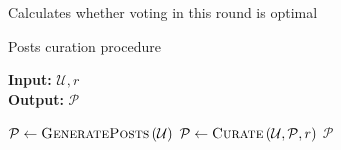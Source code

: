     \begin{algorithm}[H]
      \caption{Calculates whether voting in this round is optimal}
      \label{alg:isvoteround}
      \begin{algorithmic}[1]
          \State 
        \EndFunction
      \end{algorithmic}
    \end{algorithm}

    \begin{algorithm}[H]
      \caption{Posts curation procedure}
      \label{alg:main}
      \hspace*{\algorithmicindent} \textbf{Input:} $\mathcal{U}, r$ \\
      \hspace*{\algorithmicindent} \textbf{Output:} $\mathcal{P}$
      \begin{algorithmic}[1]
      \State $\mathcal{P} \leftarrow
      \textsc{GeneratePosts}\left(\mathcal{U}\right)$
      \State $\mathcal{P} \leftarrow \textsc{Curate}\left(\mathcal{U},
      \mathcal{P}, r\right)$
      \State \Return $\mathcal{P}$
      \end{algorithmic}
    \end{algorithm}
